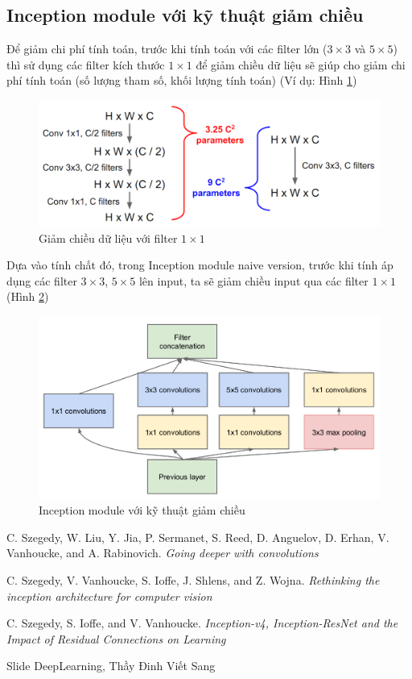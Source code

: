 \documentclass[a4paper,12pt]{report}
\begin{document}
\subsection{Inception module với kỹ thuật giảm chiều}
Để giảm chi phí tính toán, trước khi tính toán với các filter lớn ($3\times 3$ và $5 \times 5$) thì sử dụng các filter kích thước $1 \times 1$ để giảm chiều dữ liệu sẽ giúp cho giảm chi phí tính toán (số lượng tham số, khối lượng tính toán) (Ví dụ: Hình \ref{fig_reduce1x1})
\begin{figure}[H]
\centering
\includegraphics[scale=0.4]{reduce_1x1.png}
\caption{Giảm chiều dữ liệu với filter $1 \times 1$}
\label{fig_reduce1x1}
\end{figure}
\par Dựa vào tính chất đó, trong Inception module naive version, trước khi tính áp dụng các filter $3 \times 3$, $5 \times 5$ lên input, ta sẽ giảm chiều input qua các filter $1 \times 1$ (Hình \ref{fig_inception_reduce})
\begin{figure}[H]
\centering 
\includegraphics[scale=0.45]{inception_reduce.png}
\caption{Inception module với kỹ thuật giảm chiều}
\label{fig_inception_reduce}
\end{figure}



\begin{thebibliography}{9}
 C. Szegedy, W. Liu, Y. Jia, P. Sermanet, S. Reed, D. Anguelov, D. Erhan, V. Vanhoucke, and A. Rabinovich. \textit{Going deeper with convolutions}

 C. Szegedy, V. Vanhoucke, S. Ioffe, J. Shlens, and Z. Wojna. \textit{Rethinking the inception architecture for computer vision}

 C. Szegedy, S. Ioffe, and V. Vanhoucke. \textit{Inception-v4, Inception-ResNet and the Impact of Residual Connections on Learning}

 Slide DeepLearning, Thầy Đinh Viết Sang 

\end{thebibliography}
\end{document}

